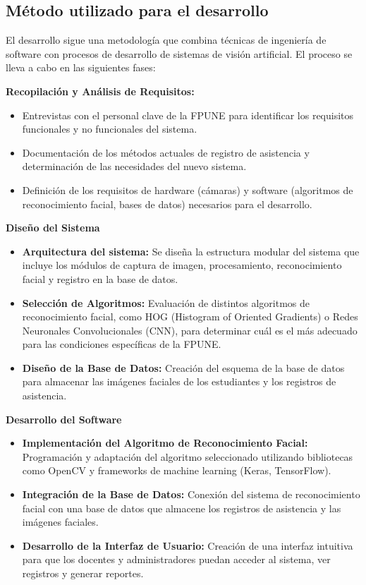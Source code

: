 \subsection{Método utilizado para el desarrollo}

El desarrollo sigue una metodología que combina técnicas de ingeniería de software con procesos de desarrollo de sistemas de visión artificial. El proceso se lleva a cabo en las siguientes fases:


\textbf{Recopilación y Análisis de Requisitos:}
\begin{itemize}
        \item Entrevistas con el personal clave de la FPUNE para identificar los requisitos funcionales y no funcionales del sistema.
        \item Documentación de los métodos actuales de registro de asistencia y determinación de las necesidades del nuevo sistema.
        \item Definición de los requisitos de hardware (cámaras) y software (algoritmos de reconocimiento facial, bases de datos) necesarios para el desarrollo.
\end{itemize}

\newpage

\textbf{Diseño del Sistema}
\begin{itemize}
    \item \textbf{Arquitectura del sistema:} Se diseña la estructura modular del sistema que incluye los módulos de captura de imagen, procesamiento, reconocimiento facial y registro en la base de datos.

    \item \textbf{Selección de Algoritmos:} Evaluación de distintos algoritmos de reconocimiento facial, como HOG (Histogram of Oriented Gradients) o Redes Neuronales Convolucionales (CNN), para determinar cuál es el más adecuado para las condiciones específicas de la FPUNE.

    \item \textbf{Diseño de la Base de Datos:} Creación del esquema de la base de datos para almacenar las imágenes faciales de los estudiantes y los registros de asistencia.
\end{itemize}


\textbf{Desarrollo del Software}

\begin{itemize}
    \item \textbf{Implementación del Algoritmo de Reconocimiento Facial:} Programación y adaptación del algoritmo seleccionado utilizando bibliotecas como OpenCV y frameworks de machine learning (Keras, TensorFlow).

    \item \textbf{Integración de la Base de Datos:} Conexión del sistema de reconocimiento facial con una base de datos que almacene los registros de asistencia y las imágenes faciales.

    \item \textbf{Desarrollo de la Interfaz de Usuario:} Creación de una interfaz intuitiva para que los docentes y administradores puedan acceder al sistema, ver registros y generar reportes.
\end{itemize}

